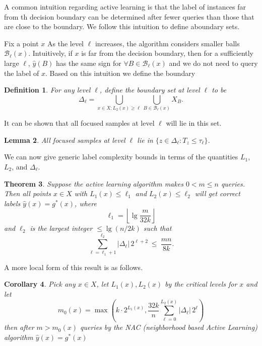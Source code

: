 \documentclass{article}
\def\B{{\mathcal B}}
\def\yh{{\widehat{y}}}
\newtheorem{thm}{Theorem}
\newtheorem{lemma}[thm]{Lemma}
\newtheorem{cor}[thm]{Corollary}
\newtheorem{defn}[thm]{Definition}
\begin{document}
A common intuition regarding active learning is that the label of
instances far from th decision boundary can be determined after fewer
queries than those that are close to the boundary. We follow this
intuition to define aboundary sets.

Fix a point $x$ As the level $\ell$ increases, the algorithm considers
smaller balls $\B_\ell(x)$. Intuitively, if $x$ is far from the
decision boundary, then for a sufficiently large $\ell$, $\yh(B)$ has
the same sign for $\forall B \in \B_\ell(x)$ and we do not need to
query the label of $x$. Based on this intuition we define the boundary

\begin{defn}
For any level $\ell$, define the \emph{boundary set} at level $\ell$ to be
\begin{equation}
\Delta_\ell 
= \bigcup_{x \in X: L_2(x) \geq \ell} \bigcup_{B \in \B_{\ell}(x)} X_B 
.
\label{eq:sampling-region}
\end{equation}
\end{defn}

It can be shown that all focused samples at level $\ell$ will lie in this set.
\begin{lemma}
All focused samples at level $\ell$ lie in $\{z \in \Delta_\ell: T_z \leq \tau_\ell \}$.
\label{lemma:focused}
\end{lemma}

We can now give generic label complexity bounds in terms of the quantities $L_1$, $L_2$, and $\Delta_\ell$.


\begin{thm}
Suppose the active learning algorithm makes $0 < m \leq n$ queries. Then all points $x \in X$ with $L_1(x) \leq \ell_1$ and $L_2(x) \leq \ell_2$ will get correct labels $\yh(x) = g^*(x)$, where
$$ \ell_1 = \left\lfloor \lg \frac{m}{32k} \right\rfloor $$
and $\ell_2$ is the largest integer $\leq \lg (n/2k)$ such that
$$ \sum_{\ell = \ell_1 + 1}^{\ell_2} |\Delta_{\ell}| \, 2^{\ell+2} \ \leq \ \frac{mn}{8k} .$$
\label{thm:label-complexity}
\end{thm}

A more local form of this result is as follows.
\begin{cor}
Pick any $x \in X$, let $L_1(x),L_2(x)$ by the critical levels for $x$ and let
\[
m_0(x) = \max\left( k \cdot 2^{L_1(x)}, \frac{32k}{n} \sum_{\ell=0}^{L_2(x)} |\Delta_\ell| \, 2^\ell\right)
\]
then after $m>m_0(x)$ queries by the NAC (neighborhood based Active Learning) algorithm $\yh(x) = g^*(x)$
\end{cor}
\end{document}

